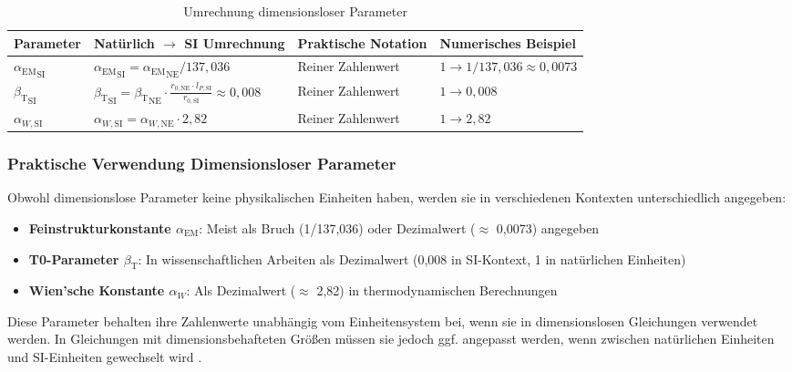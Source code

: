 \documentclass[12pt,a4paper]{article}
\newcommand{\alphaEM}{\alpha_{\text{EM}}}
\newcommand{\betaT}{\beta_{\text{T}}}
\begin{document}
	\begin{table}[ht]
		\centering
		\begin{adjustbox}{scale=0.85}
			\begin{tabular}{llll}
				\hline
				\textbf{Parameter} & \textbf{Natürlich $\to$ SI Umrechnung} & \textbf{Praktische Notation} & \textbf{Numerisches Beispiel} \\
				\hline 
				${\alphaEM}_{\text{SI}}$ & ${\alphaEM}_{\text{SI}} = {\alphaEM}_{\text{NE}}/137,036$ & Reiner Zahlenwert & $1 \to 1/137,036 \approx 0,0073$ \\
				${\betaT}_{\text{SI}}$ & ${\betaT}_{\text{SI}} = {\betaT}_{\text{NE}} \cdot \frac{r_{0,\text{NE}}\cdot l_{P,\text{SI}}}{r_{0,\text{SI}}} \approx 0,008$ & Reiner Zahlenwert & $1 \to 0,008$ \\
				$\alpha_{W,\text{SI}}$ & $\alpha_{W,\text{SI}} = \alpha_{W,\text{NE}} \cdot 2,82$ & Reiner Zahlenwert & $1 \to 2,82$ \\

				\hline
			\end{tabular}
		\end{adjustbox}
		\caption{Umrechnung dimensionsloser Parameter}
		\label{tab:dimensionless_conversion}
	\end{table}
	
	\subsubsection{Praktische Verwendung Dimensionsloser Parameter}
	
	Obwohl dimensionslose Parameter keine physikalischen Einheiten haben, werden sie in verschiedenen Kontexten unterschiedlich angegeben:
	
	\begin{itemize}
		\item \textbf{Feinstrukturkonstante $\alphaEM$}: Meist als Bruch (1/137,036) oder Dezimalwert ($\approx$ 0,0073) angegeben
		\item \textbf{T0-Parameter $\betaT$}: In wissenschaftlichen Arbeiten als Dezimalwert (0,008 in SI-Kontext, 1 in natürlichen Einheiten)
		\item \textbf{Wien'sche Konstante $\alpha_W$}: Als Dezimalwert ($\approx$ 2,82) in thermodynamischen Berechnungen
	\end{itemize}
	
	Diese Parameter behalten ihre Zahlenwerte unabhängig vom Einheitensystem bei, wenn sie in dimensionslosen Gleichungen verwendet werden. In Gleichungen mit dimensionsbehafteten Größen müssen sie jedoch ggf. angepasst werden, wenn zwischen natürlichen Einheiten und SI-Einheiten gewechselt wird \cite{pascher_alpha_2025, pascher_beta_2025}.
	
\end{document}
